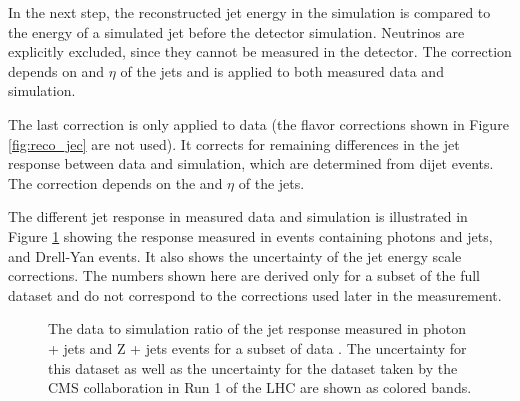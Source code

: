 In the next step, the reconstructed jet energy in the simulation is compared to the energy of a simulated jet before the detector simulation. Neutrinos are explicitly excluded, since they cannot be measured in the detector.
The correction depends on \pt and $\eta$ of the jets and is applied to both measured data and simulation.

The last correction is only applied to data (the flavor corrections shown in Figure \ref{fig:reco_jec} are not used). It corrects for remaining differences in the jet response between data and simulation, which are determined
from dijet events. The correction depends on the \pt and $\eta$ of the jets.

The different jet response in measured data and simulation is illustrated in Figure \ref{fig:reco_jetresponse} showing the response measured in events containing photons and jets, and Drell-Yan events.
It also shows the uncertainty of the jet energy scale corrections. The numbers shown here are derived only for a subset of the full dataset and do not correspond to the corrections used later in the measurement.

\begin{figure}[htbp!]
  \begin{center}
\caption{The data to simulation ratio of the jet response measured in photon + jets and Z + jets events for a subset of data \cite{CMS-DP-2016-020}. The uncertainty for this dataset as well as the uncertainty for the dataset taken by the CMS collaboration
in Run 1 of the LHC are shown as colored bands. 
  \label{fig:reco_jetresponse}}
  \end{center}
\end{figure}


